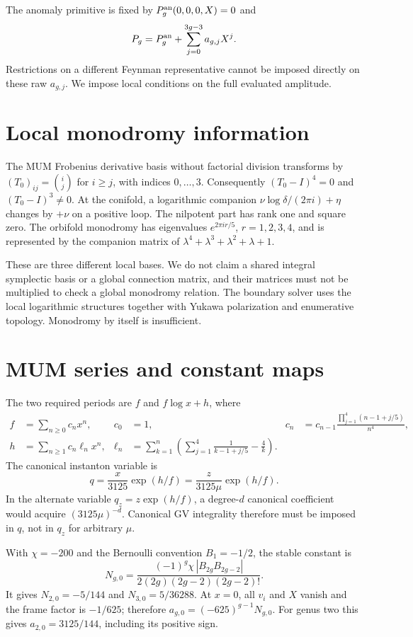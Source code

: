 \documentclass[11pt]{article}
\begin{document}
The anomaly primitive is fixed by $P_g^{\rm an}(0,0,0,X)=0$ and
\[
 P_g=P_g^{\rm an}+\sum_{j=0}^{3g-3}a_{g,j}X^j.
\]
Restrictions on a different Feynman representative cannot be imposed directly
on these raw $a_{g,j}$. We impose local conditions on the full evaluated amplitude.

\section{Local monodromy information}
The MUM Frobenius derivative basis without factorial division transforms by
$(T_0)_{ij}=\binom{i}{j}$ for $i\ge j$, with indices $0,\ldots,3$.
Consequently $(T_0-I)^4=0$ and $(T_0-I)^3\ne0$.
At the conifold, a logarithmic companion
$\nu\log\delta/(2\pi i)+\eta$ changes by $+\nu$ on a positive loop.
The nilpotent part has rank one and square zero.
The orbifold monodromy has eigenvalues $e^{2\pi i r/5}$,
$r=1,2,3,4$, and is represented by the companion matrix of
$\lambda^4+\lambda^3+\lambda^2+\lambda+1$.

These are three different local bases. We do not claim a shared integral
symplectic basis or a global connection matrix, and their matrices must not
be multiplied to check a global monodromy relation. The boundary solver uses
the local logarithmic structures together with Yukawa polarization and
enumerative topology. Monodromy by itself is insufficient.

\section{MUM series and constant maps}
The two required periods are $f$ and $f\log x+h$, where
\begin{align*}
 f&=\sum_{n\ge0}c_nx^n,&c_0&=1,&
 c_n&=c_{n-1}\frac{\prod_{j=1}^4(n-1+j/5)}{n^4},\\
 h&=\sum_{n\ge1}c_n\ell_nx^n,&
 \ell_n&=\sum_{k=1}^n\left(\sum_{j=1}^4\frac1{k-1+j/5}-\frac4k\right).
\end{align*}
The canonical instanton variable is
\[
 q=\frac{x}{3125}\exp(h/f)=\frac{z}{3125\mu}\exp(h/f).
\]
In the alternate variable $q_z=z\exp(h/f)$, a degree-$d$ canonical
coefficient would acquire $(3125\mu)^{-d}$. Canonical GV integrality therefore
must be imposed in $q$, not in $q_z$ for arbitrary $\mu$.

With $\chi=-200$ and the Bernoulli convention $B_1=-1/2$, the stable constant is
\[
 N_{g,0}=\frac{(-1)^g\chi\,|B_{2g}B_{2g-2}|}
 {2(2g)(2g-2)(2g-2)!}.
\]
It gives $N_{2,0}=-5/144$ and $N_{3,0}=5/36288$.
At $x=0$, all $v_i$ and $X$ vanish and the frame factor is $-1/625$;
therefore $a_{g,0}=(-625)^{g-1}N_{g,0}$.
For genus two this gives $a_{2,0}=3125/144$, including its positive sign.
\end{document}
